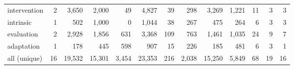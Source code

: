 \begin{table}[!tbp]
\begin{tabular}{@{}lrrrrrrrrrrrr@{}}
intervention & 2 & 3,650 & 2,000 & 49 & 4,827 & 39 & 298 & 3,269 & 1,221 & 11 & 3 & 3 \\
intrinsic & 1 & 502 & 1,000 & 0 & 1,044 & 38 & 267 & 475 & 264 & 6 & 3 & 3 \\
evaluation & 2 & 2,928 & 1,856 & 631 & 3,368 & 109 & 763 & 1,461 & 1,035 & 24 & 9 & 7 \\
adaptation & 1 & 178 & 445 & 598 & 907 & 15 & 226 & 185 & 481 & 6 & 3 & 1 \\
\midrule
all (unique) & 16 & 19,532 & 15,301 & 3,454 & 23,353 & 216 & 2,038 & 15,250 & 5,849 & 68 & 19 & 16 \\
\bottomrule
\end{tabular}
\end{table}
